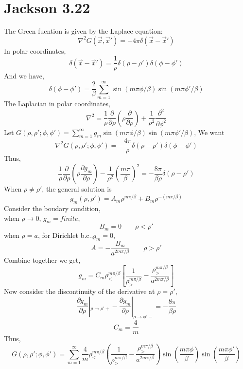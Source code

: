 \documentclass{article}
\newcommand{\pd}[2]{\frac{\partial#1}{\partial#2}}
\begin{document}
\section*{Jackson 3.22}

The Green fucntion is given by the Laplace equation:
\[ \nabla^2 G(\vec x,\vec x')=-4\pi\delta(\vec x-\vec x')\]
In polar coordinates,
\[ \delta(\vec x-\vec x')=\frac{1}{\rho}\delta(\rho-\rho')\delta(\phi-\phi') \]
And we have,
\[ \delta(\phi-\phi')=\frac{2}{\beta}\sum^{\infty}_{m=1}\sin(m\pi\phi/\beta)\sin(m\pi\phi'/\beta) \]
The Laplacian in polar coordinates,
\[\nabla^2=\frac{1}{\rho}\pd{}{\rho}(\rho\pd{}{\rho})+\frac{1}{\rho^2}\pd{^2}{\phi^2} \]
Let $G(\rho,\rho';\phi,\phi')=\sum^{\infty}_{m=1}g_m\sin(m\pi\phi/\beta)\sin(m\pi\phi'/\beta)$,
We want
\[ \nabla^2 G(\rho,\rho';\phi,\phi')=-\frac{4\pi}{\rho}\delta(\rho-\rho')\delta(\phi-\phi') \]
Thus,
\[\frac{1}{\rho}\pd{}{\rho}(\rho\pd{g_m}{\rho})-\frac{1}{\rho^2}(\frac{m\pi}{\beta})^2=-\frac{8\pi}{\beta\rho}\delta(\rho-\rho') \]
When $\rho\neq\rho'$, the general solution is
\[ g_m(\rho,\rho')=A_m\rho^{m\pi/\beta}+B_m\rho^{-(m\pi/\beta)} \]
Consider the boudary condition,\\
when $\rho\rightarrow 0$, $g_m=finite$,
\[ B_m=0\qquad \rho<\rho' \]
when $\rho=a$, for Dirichlet b.c.,$g_m=0$,
\[ A=-\frac{B_m}{a^{2m\pi/\beta}} \qquad \rho>\rho'\]
Combine together we get,
\[ g_m=C_m\rho_<^{m\pi/\beta}[\frac{1}{\rho_>^{m\pi/\beta}}-\frac{\rho_>^{m\pi/\beta}}{a^{2m\pi/\beta}}]   \]
Now consider the discontinuity of the derivative at $\rho=\rho'$,
\[ \pd{g_m}{\rho}|_{\rho\rightarrow\rho'+}-\pd{g_m}{\rho}|_{\rho\rightarrow\phi'-}=-\frac{8\pi}{\beta\rho} \]
\[ C_m=\frac{4}{m} \]
Thus,
\[\boxed{G(\rho,\rho';\phi,\phi')=\sum^{\infty}_{m=1}\frac 4m \rho^{m\pi/\beta}_<(\frac{1}{\rho_>^{m\pi/\beta}}-\frac{\rho_>^{m\pi/\beta}}{a^{2m\pi/\beta}})\sin(\frac{m\pi\phi}{\beta})\sin(\frac{m\pi\phi'}{\beta})}\]


% 
% 
\end{document}
